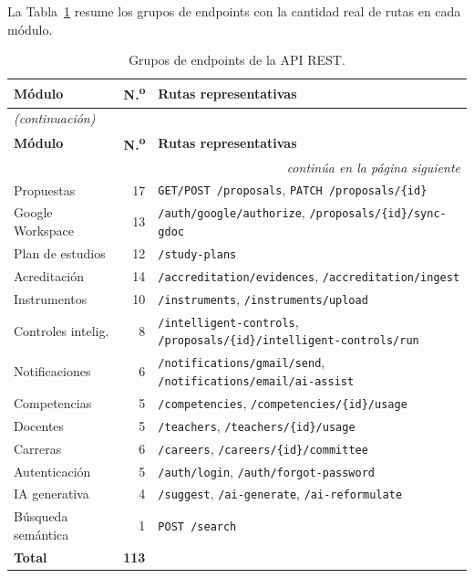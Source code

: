 La Tabla~\ref{tab:endpoints} resume los grupos de endpoints con la
cantidad real de rutas en cada módulo.

\begin{longtable}{p{4cm}rp{10cm}}
\caption{Grupos de endpoints de la API REST.}
\label{tab:endpoints}\\
\toprule
\textbf{Módulo} & \textbf{N.\textsuperscript{o}} & \textbf{Rutas representativas} \\
\midrule
\endfirsthead
\multicolumn{3}{l}{\small\textit{(continuación)}} \\
\toprule
\textbf{Módulo} & \textbf{N.\textsuperscript{o}} & \textbf{Rutas representativas} \\
\midrule
\endhead
\midrule
\multicolumn{3}{r}{\small\textit{continúa en la página siguiente}} \\
\endfoot
\bottomrule
\endlastfoot
Propuestas         & 17 & \texttt{GET/POST /proposals},
                          \texttt{PATCH /proposals/\{id\}} \\
Google Workspace   & 13 & \texttt{/auth/google/authorize},
                          \texttt{/proposals/\{id\}/sync-gdoc} \\
Plan de estudios   & 12 & \texttt{/study-plans}\\
Acreditación       & 14 & \texttt{/accreditation/evidences},
                          \texttt{/accreditation/ingest} \\
Instrumentos       & 10 & \texttt{/instruments},
                          \texttt{/instruments/upload} \\
Controles intelig. &  8 & \texttt{/intelligent-controls},
                          \texttt{/proposals/\{id\}/intelligent-controls/run} \\
Notificaciones     &  6 & \texttt{/notifications/gmail/send},
                          \texttt{/notifications/email/ai-assist} \\
Competencias       &  5 & \texttt{/competencies},
                          \texttt{/competencies/\{id\}/usage} \\
Docentes           &  5 & \texttt{/teachers},
                          \texttt{/teachers/\{id\}/usage} \\
Carreras           &  6 & \texttt{/careers},
                          \texttt{/careers/\{id\}/committee} \\
Autenticación      &  5 & \texttt{/auth/login},
                          \texttt{/auth/forgot-password} \\
IA generativa      &  4 & \texttt{/suggest},
                          \texttt{/ai-generate},
                          \texttt{/ai-reformulate} \\
Búsqueda semántica &  1 & \texttt{POST /search} \\
\midrule
\textbf{Total} & \textbf{113} & \\
\end{longtable}

